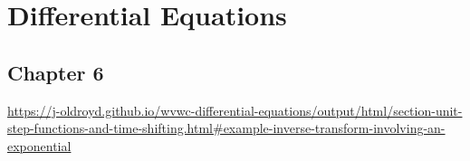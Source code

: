 \documentclass{article}
\begin{document}
\section{Differential Equations} %
\label{sec:differential_equations}
  \subsection{Chapter 6}
    \href{Example 6.3.3: Inverse transform involving an exponential}{https://j-oldroyd.github.io/wvwc-differential-equations/output/html/section-unit-step-functions-and-time-shifting.html\#example-inverse-transform-involving-an-exponential}
    \begin{center}
    \end{center}
\end{document}
